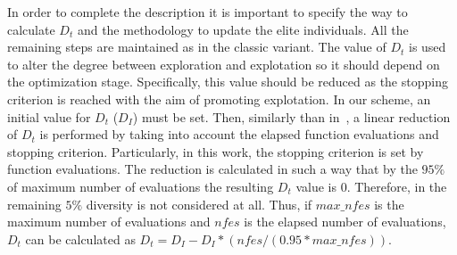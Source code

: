 In order to complete the description it is important to specify the way to calculate $D_t$ and the methodology to update the 
elite individuals.
%
All the remaining steps are maintained as in the classic \DE{} variant.
%
The value of $D_t$ is used to alter the degree between exploration and explotation so it should depend on the optimization stage.
%
Specifically, this value should be reduced as the stopping criterion is reached with the aim of promoting explotation.
%
In our scheme, an initial value for $D_t$ ($D_I$) must be set.
%
Then, similarly than in~\cite{segura2016novel}, a linear reduction of $D_t$ is performed by taking into account the elapsed function evaluations and stopping criterion.
%
Particularly, in this work, the stopping criterion is set by function evaluations.
%
The reduction is calculated in such a way that by the $95\%$ of maximum number of evaluations the resulting $D_t$ value is $0$.
%
Therefore, in the remaining $5\%$ diversity is not considered at all.
%
Thus, if $max\_nfes$ is the maximum number of evaluations and $nfes$ is the elapsed number of evaluations, $D_t$ can be calculated as $D_t=D_I - D_I *(nfes/(0.95*max\_nfes))$.
%
%

%


